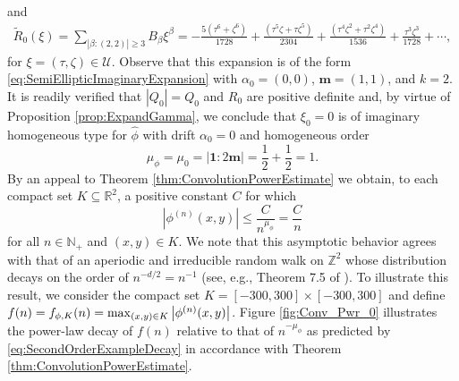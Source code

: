 \documentclass[11pt, letter]{book}
\newenvironment{example}
  {\pushQED{\qed}\renewcommand{\qedsymbol}{$\triangle$}\examplex}
  {\popQED\endexamplex}
\newcommand{\f}[2]{\frac{#1}{#2}}
\begin{document}
\begin{example}
\begin{equation*}
\end{equation*}
and
\begin{eqnarray*}
\widetilde{R}_{0}(\xi)=\sum_{|\beta:(2,2)|\geq 3}B_\beta \xi^\beta =
-\f{5(\tau^6+\zeta^6)}{1728} + \f{(\tau^5\zeta+\tau\zeta^5)}{2304} + \frac{(\tau^4\zeta^2+\tau^2\zeta^4)}{1536} +   \frac{\tau^3\zeta^3}{1728} + \cdots, 
\end{eqnarray*}
for $\xi=(\tau,\zeta)\in\mathcal{U}$. Observe that this expansion is of the form \eqref{eq:SemiEllipticImaginaryExpansion} with $\alpha_0=(0,0)$, $\mathbf{m}=(1,1)$, and $k=2$. It is readily verified that $|Q_0|=Q_0$ and $R_0$ are positive definite and, by virtue of Proposition \ref{prop:ExpandGamma}, we conclude that $\xi_0=0$ is of imaginary homogeneous type for $\widehat\phi$ with drift $\alpha_0=0$ and homogeneous order
\begin{equation*}
    \mu_{\phi}=\mu_0=|\mathbf{1}:2\mathbf{m}|=\frac{1}{2}+\frac{1}{2}=1.
\end{equation*}
By an appeal to Theorem \ref{thm:ConvolutionPowerEstimate} we obtain, to each compact set $K\subseteq\mathbb{R}^2$, a positive constant $C$ for which
\begin{equation}\label{eq:SecondOrderExampleDecay}
    |\phi^{(n)}(x,y)|\leq \frac{C}{n^{\mu_\phi}}=\frac{C}{n}
\end{equation}
for all $n\in\mathbb{N}_+$ and $(x,y)\in K$. We note that this asymptotic behavior agrees with that of an aperiodic and irreducible random walk on $\mathbb{Z}^2$ whose distribution decays on the order of $n^{-d/2}=n^{-1}$ (see, e.g., Theorem 7.5 of \cite{randles_convolution_2017}). To illustrate this result, we consider the compact set $K = [-300, 300] \times [-300, 300]$ and define $f(n)=f_{\phi,K}(n)=\max_{(x,y)\in K}\abs{\phi^{(n)}(x,y)}$. Figure \ref{fig:Conv_Pwr_0} illustrates the power-law decay of $f(n)$ relative to that of $n^{-\mu_\phi}$ as predicted by \eqref{eq:SecondOrderExampleDecay} in accordance with Theorem \ref{thm:ConvolutionPowerEstimate}.\\



\end{example}
\end{document}
